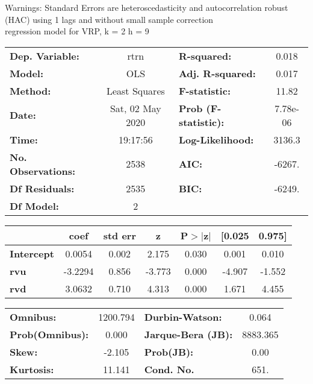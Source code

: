 Warnings: \newline
 [1] Standard Errors are heteroscedasticity and autocorrelation robust (HAC) using 1 lags and without small sample correction\\ 

regression model for VRP, k = 2 h = 9\begin{center}
\begin{tabular}{lclc}
\toprule
\textbf{Dep. Variable:}    &       rtrn       & \textbf{  R-squared:         } &     0.018   \\
\textbf{Model:}            &       OLS        & \textbf{  Adj. R-squared:    } &     0.017   \\
\textbf{Method:}           &  Least Squares   & \textbf{  F-statistic:       } &     11.82   \\
\textbf{Date:}             & Sat, 02 May 2020 & \textbf{  Prob (F-statistic):} &  7.78e-06   \\
\textbf{Time:}             &     19:17:56     & \textbf{  Log-Likelihood:    } &    3136.3   \\
\textbf{No. Observations:} &        2538      & \textbf{  AIC:               } &    -6267.   \\
\textbf{Df Residuals:}     &        2535      & \textbf{  BIC:               } &    -6249.   \\
\textbf{Df Model:}         &           2      & \textbf{                     } &             \\
\bottomrule
\end{tabular}
\begin{tabular}{lcccccc}
                   & \textbf{coef} & \textbf{std err} & \textbf{z} & \textbf{P$> |$z$|$} & \textbf{[0.025} & \textbf{0.975]}  \\
\midrule
\textbf{Intercept} &       0.0054  &        0.002     &     2.175  &         0.030        &        0.001    &        0.010     \\
\textbf{rvu}       &      -3.2294  &        0.856     &    -3.773  &         0.000        &       -4.907    &       -1.552     \\
\textbf{rvd}       &       3.0632  &        0.710     &     4.313  &         0.000        &        1.671    &        4.455     \\
\bottomrule
\end{tabular}
\begin{tabular}{lclc}
\textbf{Omnibus:}       & 1200.794 & \textbf{  Durbin-Watson:     } &    0.064  \\
\textbf{Prob(Omnibus):} &   0.000  & \textbf{  Jarque-Bera (JB):  } & 8883.365  \\
\textbf{Skew:}          &  -2.105  & \textbf{  Prob(JB):          } &     0.00  \\
\textbf{Kurtosis:}      &  11.141  & \textbf{  Cond. No.          } &     651.  \\
\bottomrule
\end{tabular}
\end{center}

